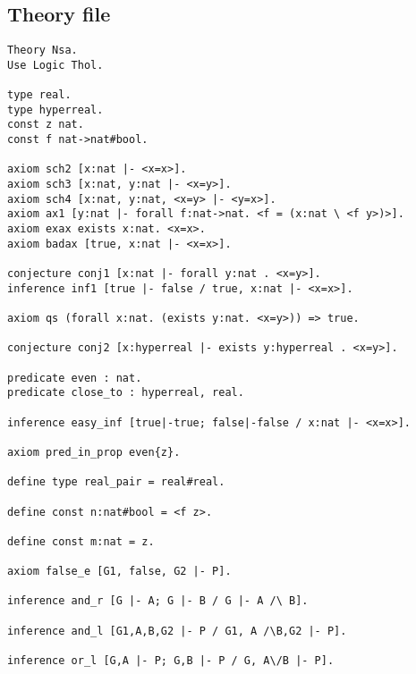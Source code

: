 \subsection{Theory file}\label{theory}
\begin{verbatim}
Theory Nsa.
Use Logic Thol.

type real.
type hyperreal.
const z nat.
const f nat->nat#bool.

axiom sch2 [x:nat |- <x=x>].
axiom sch3 [x:nat, y:nat |- <x=y>].
axiom sch4 [x:nat, y:nat, <x=y> |- <y=x>].
axiom ax1 [y:nat |- forall f:nat->nat. <f = (x:nat \ <f y>)>].
axiom exax exists x:nat. <x=x>.
axiom badax [true, x:nat |- <x=x>].

conjecture conj1 [x:nat |- forall y:nat . <x=y>].
inference inf1 [true |- false / true, x:nat |- <x=x>].

axiom qs (forall x:nat. (exists y:nat. <x=y>)) => true.

conjecture conj2 [x:hyperreal |- exists y:hyperreal . <x=y>].

predicate even : nat.
predicate close_to : hyperreal, real.

inference easy_inf [true|-true; false|-false / x:nat |- <x=x>].

axiom pred_in_prop even{z}.

define type real_pair = real#real.

define const n:nat#bool = <f z>.

define const m:nat = z.

axiom false_e [G1, false, G2 |- P].

inference and_r [G |- A; G |- B / G |- A /\ B].

inference and_l [G1,A,B,G2 |- P / G1, A /\B,G2 |- P].

inference or_l [G,A |- P; G,B |- P / G, A\/B |- P].
\end{verbatim}


